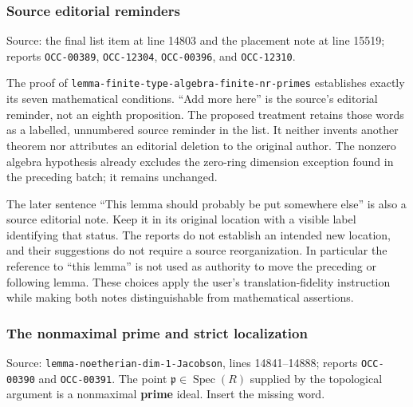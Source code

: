 \subsubsection{Source editorial reminders}\label{algebra-proof-004-source-editorial-reminders}

Source: the final list item at line 14803 and the placement note at line 15519; reports \texttt{OCC-00389}, \texttt{OCC-12304}, \texttt{OCC-00396}, and \texttt{OCC-12310}.

The proof of \texttt{lemma-\AlgebraIdentifierBreak{}finite-\AlgebraIdentifierBreak{}type-\AlgebraIdentifierBreak{}algebra-\AlgebraIdentifierBreak{}finite-\AlgebraIdentifierBreak{}nr-\AlgebraIdentifierBreak{}primes} establishes exactly its seven mathematical conditions. ``Add more here'' is the source's editorial reminder, not an eighth proposition. The proposed treatment retains those words as a labelled, unnumbered source reminder in the list. It neither invents another theorem nor attributes an editorial deletion to the original author. The nonzero algebra hypothesis already excludes the zero-ring dimension exception found in the preceding batch; it remains unchanged.

The later sentence ``This lemma should probably be put somewhere else'' is also a source editorial note. Keep it in its original location with a visible label identifying that status. The reports do not establish an intended new location, and their suggestions do not require a source reorganization. In particular the reference to ``this lemma'' is not used as authority to move the preceding or following lemma. These choices apply the user's translation-fidelity instruction while making both notes distinguishable from mathematical assertions.

\subsubsection{The nonmaximal prime and strict localization}\label{algebra-proof-004-the-nonmaximal-prime-and-strict-localization}

Source: \texttt{lemma-\AlgebraIdentifierBreak{}noetherian-\AlgebraIdentifierBreak{}dim-\AlgebraIdentifierBreak{}1-\AlgebraIdentifierBreak{}Jacobson}, lines 14841--14888; reports \texttt{OCC-00390} and \texttt{OCC-00391}. The point \(\mathfrak p\in\operatorname{Spec}(R)\) supplied by the topological argument is a nonmaximal \textbf{prime} ideal. Insert the missing word.

